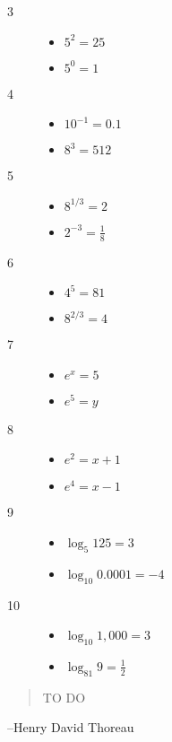 \documentclass{exam}
\begin{document}
    \begin{description}

      \item[3] 
        \begin{itemize}[a]
          \item $5^2 = 25$
          \item $5^0 = 1$
        \end{itemize}

    \item[4] 
      \begin{itemize}[a]
        \item $10^{-1} = 0.1$
        \item $8^3 = 512$

      \end{itemize}

    \item[5] 
      \begin{itemize}[a]
        \item $8^{1/3} = 2$
        \item $2^{-3} = \frac{1}{8}$
      \end{itemize}

    \item[6] 
      \begin{itemize}[a]
        \item $4^5 = 81$
        \item $8^{2/3} = 4$
      \end{itemize}

    \item[7] 
      \begin{itemize}[a]
        \item $e^x = 5$
        \item $e^5 = y$
      \end{itemize}

    \item[8] 
      \begin{itemize}[a]
        \item $e^2 = x + 1$
        \item $e^4 = x - 1$
      \end{itemize}

    \item[9] 
      \begin{itemize}[a]
        \item $\log_5 125 = 3$
        \item $\log_{10} 0.0001 = -4$
      \end{itemize}

    \item[10] 
      \begin{itemize}[a]
        \item $\log_{10} 1,000 = 3$
        \item $\log_{81} 9 = \frac{1}{2}$
      \end{itemize}

    \end{description}


  \else
    \vspace{6 cm}
    \begin{quote}
      \begin{em}
        TO DO
      \end{em}
    \end{quote}

    \hspace{1 cm} --Henry David Thoreau
  \fi
\end{document}
